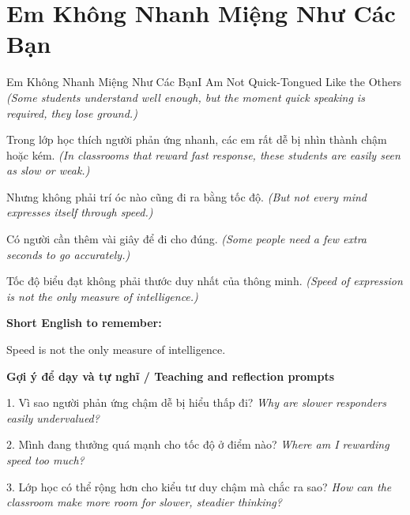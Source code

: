 \section{Em Không Nhanh Miệng Như Các Bạn}
\begin{truyen}{Em Không Nhanh Miệng Như Các Bạn}{I Am Not Quick-Tongued Like the Others}
\textit{(Some students understand well enough, but the moment quick speaking is required, they lose ground.)}

Trong lớp học thích người phản ứng nhanh, các em rất dễ bị nhìn thành chậm hoặc kém.
\textit{(In classrooms that reward fast response, these students are easily seen as slow or weak.)}

Nhưng không phải trí óc nào cũng đi ra bằng tốc độ.
\textit{(But not every mind expresses itself through speed.)}

Có người cần thêm vài giây để đi cho đúng.
\textit{(Some people need a few extra seconds to go accurately.)}

\end{truyen}

\begin{baihoc}
Tốc độ biểu đạt không phải thước duy nhất của thông minh.
\textit{(Speed of expression is not the only measure of intelligence.)}
\end{baihoc}

\begin{ghinhoanh}
\textbf{Short English to remember:}

Speed is not the only measure of intelligence.

\end{ghinhoanh}

\begin{tuhocnhanh}
\textbf{Gợi ý để dạy và tự nghĩ / Teaching and reflection prompts}

1. Vì sao người phản ứng chậm dễ bị hiểu thấp đi? \textit{Why are slower responders easily undervalued?}

2. Mình đang thưởng quá mạnh cho tốc độ ở điểm nào? \textit{Where am I rewarding speed too much?}

3. Lớp học có thể rộng hơn cho kiểu tư duy chậm mà chắc ra sao? \textit{How can the classroom make more room for slower, steadier thinking?}
\end{tuhocnhanh}
\ngancach

